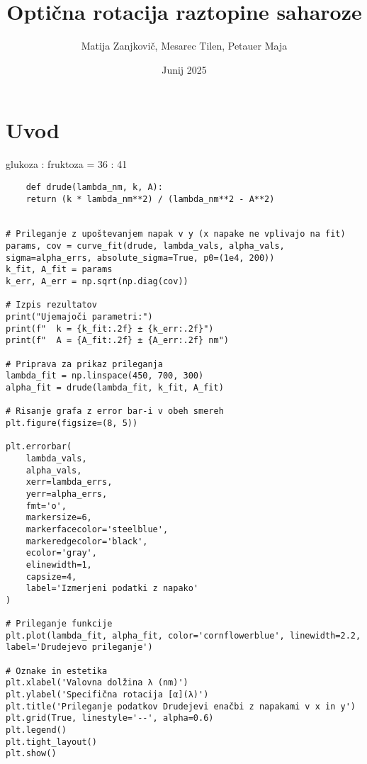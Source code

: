 \documentclass[12pt]{extarticle}
\title{Optična rotacija raztopine saharoze}
\author{Matija Zanjkovič, Mesarec Tilen, Petauer Maja}
\date{Junij 2025}
\begin{document}
\maketitle

\section*{Uvod}

glukoza : fruktoza = 36 : 41


\begin{verbatim}
    def drude(lambda_nm, k, A):
    return (k * lambda_nm**2) / (lambda_nm**2 - A**2)


# Prileganje z upoštevanjem napak v y (x napake ne vplivajo na fit)
params, cov = curve_fit(drude, lambda_vals, alpha_vals, sigma=alpha_errs, absolute_sigma=True, p0=(1e4, 200))
k_fit, A_fit = params
k_err, A_err = np.sqrt(np.diag(cov))

# Izpis rezultatov
print("Ujemajoči parametri:")
print(f"  k = {k_fit:.2f} ± {k_err:.2f}")
print(f"  A = {A_fit:.2f} ± {A_err:.2f} nm")

# Priprava za prikaz prileganja
lambda_fit = np.linspace(450, 700, 300)
alpha_fit = drude(lambda_fit, k_fit, A_fit)

# Risanje grafa z error bar-i v obeh smereh
plt.figure(figsize=(8, 5))

plt.errorbar(
    lambda_vals,
    alpha_vals,
    xerr=lambda_errs,
    yerr=alpha_errs,
    fmt='o',
    markersize=6,
    markerfacecolor='steelblue',
    markeredgecolor='black',
    ecolor='gray',
    elinewidth=1,
    capsize=4,
    label='Izmerjeni podatki z napako'
)

# Prileganje funkcije
plt.plot(lambda_fit, alpha_fit, color='cornflowerblue', linewidth=2.2, label='Drudejevo prileganje')

# Oznake in estetika
plt.xlabel('Valovna dolžina λ (nm)')
plt.ylabel('Specifična rotacija [α](λ)')
plt.title('Prileganje podatkov Drudejevi enačbi z napakami v x in y')
plt.grid(True, linestyle='--', alpha=0.6)
plt.legend()
plt.tight_layout()
plt.show()
\end{verbatim}
\end{document}
